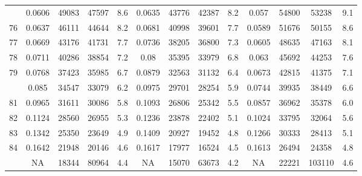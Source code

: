 \documentclass[
  14pt,
]{article}
\begin{document}
\begin{longtable}[t]{lcccccccccccc}
\addlinespace
75 & 0.0606 & 49083 & 47597 & 8.6 & 0.0635 & 43776 & 42387 & 8.2 & 0.057 & 54800 & 53238 & 9.1\\
76 & 0.0637 & 46111 & 44644 & 8.2 & 0.0681 & 40998 & 39601 & 7.7 & 0.0589 & 51676 & 50155 & 8.6\\
77 & 0.0669 & 43176 & 41731 & 7.7 & 0.0736 & 38205 & 36800 & 7.3 & 0.0605 & 48635 & 47163 & 8.1\\
78 & 0.0711 & 40286 & 38854 & 7.2 & 0.08 & 35395 & 33979 & 6.8 & 0.063 & 45692 & 44253 & 7.6\\
79 & 0.0768 & 37423 & 35985 & 6.7 & 0.0879 & 32563 & 31132 & 6.4 & 0.0673 & 42815 & 41375 & 7.1\\
\addlinespace
80 & 0.085 & 34547 & 33079 & 6.2 & 0.0975 & 29701 & 28254 & 5.9 & 0.0744 & 39935 & 38449 & 6.6\\
81 & 0.0965 & 31611 & 30086 & 5.8 & 0.1093 & 26806 & 25342 & 5.5 & 0.0857 & 36962 & 35378 & 6.0\\
82 & 0.1124 & 28560 & 26955 & 5.3 & 0.1236 & 23878 & 22402 & 5.1 & 0.1024 & 33795 & 32064 & 5.6\\
83 & 0.1342 & 25350 & 23649 & 4.9 & 0.1409 & 20927 & 19452 & 4.8 & 0.1266 & 30333 & 28413 & 5.1\\
84 & 0.1642 & 21948 & 20146 & 4.6 & 0.1617 & 17977 & 16524 & 4.5 & 0.1613 & 26494 & 24358 & 4.8\\
\addlinespace
85 & NA & 18344 & 80964 & 4.4 & NA & 15070 & 63673 & 4.2 & NA & 22221 & 103110 & 4.6\\*
\end{longtable}
\end{document}
